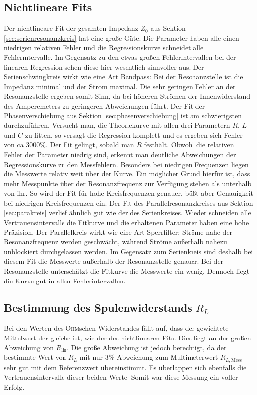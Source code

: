 \documentclass[12pt,a4paper,titlepage,headinclude]{scrartcl}
\numberwithin{equation}{subsection}
\newcommand{\mrm}[1]{\mathrm{#1}}
\newcommand{\person}[1]{\textsc{#1}}
\begin{document}
\subsection{Nichtlineare Fits}
Der nichtlineare Fit der gesamten Impedanz $Z_0$ aus Sektion \ref{sec:serienresonanzkreis} hat eine große Güte. Die Parameter haben alle einen niedrigen relativen Fehler und die Regressionskurve schneidet alle Fehlerintervalle. Im Gegensatz zu den etwas großen Fehlerintervallen bei der linearen Regression sehen diese hier wesentlich sinnvoller aus. Der Serienschwingkreis wirkt wie eine Art Bandpass: Bei der Resonanzstelle ist die Impedanz minimal und der Strom maximal. Die sehr geringen Fehler an der Resonanzstelle ergeben somit Sinn, da bei höheren Strömen der Innenwiderstand des Amperemeters zu geringeren Abweichungen führt. 
Der Fit der Phasenverschiebung aus Sektion \ref{sec:phasenverschiebung} ist am schwierigsten durchzuführen. Versucht man, die Theoriekurve mit allen drei Parametern $R$, $L$ und $C$ zu fitten, so versagt die Regression komplett und es ergeben sich Fehler von ca $3000\%$. Der Fit gelingt, sobald man $R$ festhält. Obwohl die relativen Fehler der Parameter niedrig sind, erkennt man deutliche Abweichungen der Regressionskurve zu den Messfehlern. Besonders bei niedrigen Frequenzen liegen die Messwerte relativ weit über der Kurve. Ein möglicher Grund hierfür ist, dass mehr Messpunkte über der Resonanzfrequenz zur Verfügung stehen als unterhalb von ihr. So wird der Fit für hohe Kreisfrequenzen genauer, büßt aber Genauigkeit bei niedrigen Kreisfrequenzen ein.
Der Fit des Parallelresonanzkreises aus Sektion \ref{sec:parakreis} verlief ähnlich gut wie der des Serienkreises. Wieder schneiden alle Vertrauensintervalle die Fitkurve und die erhaltenen Parameter haben eine hohe Präzision. Der Parallelkreis wirkt wie eine Art Sperrfilter: Ströme nahe der Resonanzfrequenz werden geschwächt, während Ströme außerhalb nahezu unblockiert durchgelassen werden. Im Gegensatz zum Serienkreis sind deshalb bei diesem Fit die Messwerte außerhalb der Resonanzstelle genauer. Bei der Resonanzstelle unterschätzt die Fitkurve die Messwerte ein wenig. Dennoch liegt die Kurve gut in allen Fehlerintervallen.
\subsection{Bestimmung des Spulenwiderstands $R_L$}
Bei den Werten des \person{Ohm}schen Widerstandes fällt auf, dass der gewichtete Mittelwert der gleiche ist, wie der des nichtlinearen Fits. Dies liegt an der großen Abweichung von $R_{\mrm{lin}}$. Die große Abweichung ist jedoch berechtigt, da der bestimmte Wert von $R_L$ mit nur $3\%$ Abweichung zum Multimeterwert $R_{L,\mrm{Mess}}$ sehr gut mit dem Referenzwert übereinstimmt. Es überlappen sich ebenfalls die Vertrauensintervalle dieser beiden Werte. Somit war diese Messung ein voller Erfolg.
\end{document}

